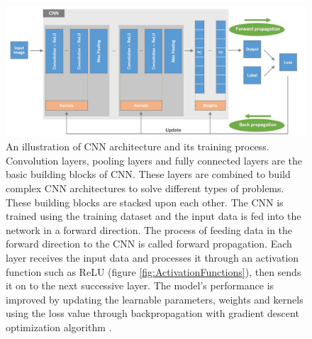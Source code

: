 \vspace*{0.3cm}
\begin{figure}[H]
        \begin{center}
	    \includegraphics[scale=0.59]{images/Fundamentals/CNNBuildingBlocks.JPG}
	    \caption[An illustration of \ac{CNN} architecture and its training process.]{An illustration of \ac{CNN} architecture and its training process. Convolution layers, pooling layers and fully connected layers are the basic building blocks of \ac{CNN}. These layers are combined to build complex \ac{CNN} architectures to solve different types of problems. These building blocks are stacked upon each other. The \ac{CNN} is trained using the training dataset and the input data is fed into the network in a forward direction. The process of feeding data in the forward direction to the \ac{CNN} is called forward propagation. Each layer receives the input data and processes it through an activation function such as \ac{ReLU} (figure \ref{fig:ActivationFunctions}), then sends it on to the next successive layer. The model's performance is improved by updating the learnable parameters, weights and kernels using the loss value through backpropagation with gradient descent optimization algorithm \cite{ruder2017overview} \cite{articleCNNs}.}
	    \label{fig:CNNBuildingBlocks}
	    \end{center}
\end{figure}





